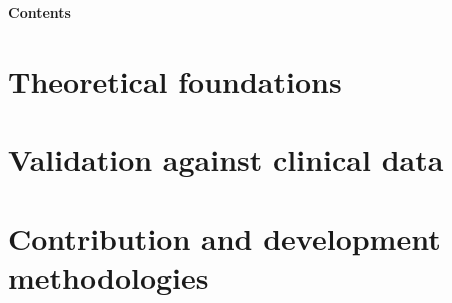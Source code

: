 \documentclass[12pt]{memoir}
\begin{document}
\thispagestyle{empty}


\newpage
\normalsize
\renewcommand{\contentsname}{} 
\par\noindent\textbf{\huge{\color{blue}Contents}}
\tableofcontents

\newpage
\normalsize


\linespread{1.5}

\normalsize


\newpage
\normalsize

\part[Theoretical foundations]{Theoretical foundations}



\newpage
\normalsize

\newpage
\normalsize
\part[Validation against clinical data]{Validation against clinical data}

\newpage
\normalsize


\newpage
\normalsize
\part[ Contribution and development methodologies]{ Contribution and development methodologies}

\newpage
\normalsize


\newpage
\normalsize
\end{document}
